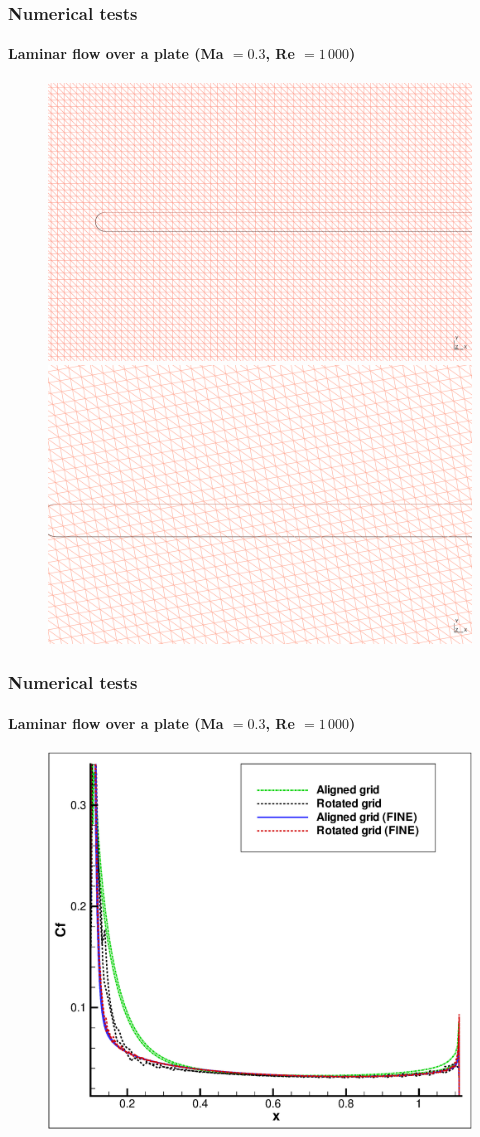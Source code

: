 \begin{frame}
\frametitle{Numerical tests}
\framesubtitle{Laminar flow over a plate (Ma $=0.3$, Re $=1\,000$)}
\begin{figure}[!ht]
  \centering
  \includegraphics[width=0.47\linewidth]{Fig/gridAligned}
  \hspace{5mm}
  \includegraphics[width=0.47\linewidth]{Fig/gridRotated}
\end{figure}
\end{frame}

\begin{frame}
\frametitle{Numerical tests}
\framesubtitle{Laminar flow over a plate (Ma $=0.3$, Re $=1\,000$)}
\begin{figure}[!ht]
  \centering
\includegraphics[width=0.65\linewidth]{Fig/CF_alignedVsRotated}
\end{figure}
\end{frame}


